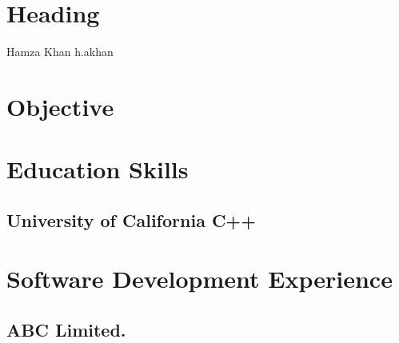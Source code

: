 \documentclass{cv}
\begin{document}
\section{Heading}
Hamza Khan
h.akhan


\section{Objective}


\section{Education      \hfill{Skills}}
\subsection{University of California \hfill{C++}}


\section{Software Development Experience}
\subsection{ABC Limited.}


\end{document}
